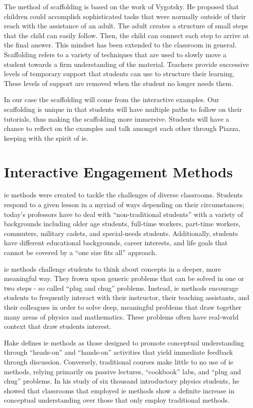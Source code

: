 The method of scaffolding is based on the work of Vygotsky. He proposed that children could accomplish sophisticated tasks that were normally outside of their reach with the assistance of an adult. The adult creates a structure of small steps that the child can easily follow. Then, the child can connect each step to arrive at the final answer. This mindset has been extended to the classroom in general. Scaffolding refers to a variety of techniques that are used to slowly move a student towards a firm understanding of the material. Teachers provide successive levels of temporary support that students can use to structure their learning. These levels of support are removed when the student no longer needs them.

In our case the scaffolding will come from the interactive examples. Our scaffolding is unique in that students will have multiple paths to follow on their tutorials, thus making the scaffolding more immersive. Students will have a chance to reflect on the examples and talk amongst each other through Piazza, keeping with the spirit of \gls{ie}.

\section{Interactive Engagement Methods}

\gls{ie} methods were created to tackle the challenges of diverse classrooms. Students respond to a given lesson in a myriad of ways depending on their circumstances; today's professors have to deal with ``non-traditional students'' with a variety of backgrounds including older age students, full-time workers, part-time workers, commuters, military cadets, and special-needs students. Additionally, students have different educational backgrounds, career interests, and life goals that cannot be covered by a ``one size fits all'' approach\cite{choy2002, horn1996, novak1999}.

\gls{ie} methods challenge students to think about concepts in a deeper, more meaningful way. They frown upon generic problems that can be solved in one or two steps - so called ``plug and chug'' problems. Instead, \gls{ie} methods encourage students to frequently interact with their instructor, their teaching assistants, and their colleagues in order to solve deep, meaningful problems that draw together many areas of physics and mathematics. These problems often have real-world context that draw students interest.

Hake defines \gls{ie} methods as those designed to promote conceptual understanding through ``heads-on'' and ``hands-on'' activities that yield immediate feedback through discussion. Conversely, traditional courses make little to no use of \gls{ie} methods, relying primarily on passive lectures, ``cookbook'' labs, and ``plug and chug'' problems\cite{hake1998}. In his study of six thousand introductory physics students, he showed that classrooms that employed \gls{ie} methods show a definite increase in conceptual understanding over those that only employ traditional methods.

